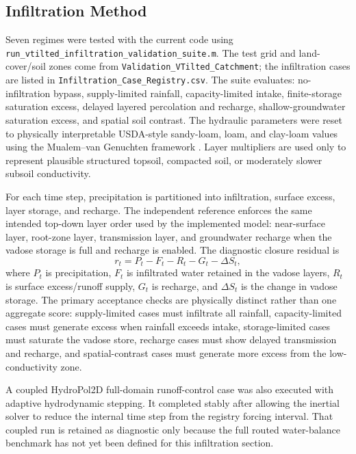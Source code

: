 \documentclass[11pt]{article}
\begin{document}
\subsection{Infiltration Method}
\label{sec:infiltration-method}
Seven regimes were tested with the current code using \texttt{run\_vtilted\_infiltration\_validation\_suite.m}. The test grid and land-cover/soil zones come from \texttt{Validation\_VTilted\_Catchment}; the infiltration cases are listed in \texttt{Infiltration\_Case\_Registry.csv}. The suite evaluates: no-infiltration bypass, supply-limited rainfall, capacity-limited intake, finite-storage saturation excess, delayed layered percolation and recharge, shallow-groundwater saturation excess, and spatial soil contrast. The hydraulic parameters were reset to physically interpretable USDA-style sandy-loam, loam, and clay-loam values using the Mualem--van Genuchten framework \cite{Mualem1976,VanGenuchten1980,CarselParrish1988}. Layer multipliers are used only to represent plausible structured topsoil, compacted soil, or moderately slower subsoil conductivity.

For each time step, precipitation is partitioned into infiltration, surface excess, layer storage, and recharge. The independent reference enforces the same intended top-down layer order used by the implemented model: near-surface layer, root-zone layer, transmission layer, and groundwater recharge when the vadose storage is full and recharge is enabled. The diagnostic closure residual is
\begin{equation}
r_t = P_t - F_t - R_t - G_t - \Delta S_t,
\end{equation}
where $P_t$ is precipitation, $F_t$ is infiltrated water retained in the vadose layers, $R_t$ is surface excess/runoff supply, $G_t$ is recharge, and $\Delta S_t$ is the change in vadose storage. The primary acceptance checks are physically distinct rather than one aggregate score: supply-limited cases must infiltrate all rainfall, capacity-limited cases must generate excess when rainfall exceeds intake, storage-limited cases must saturate the vadose store, recharge cases must show delayed transmission and recharge, and spatial-contrast cases must generate more excess from the low-conductivity zone.

A coupled HydroPol2D full-domain runoff-control case was also executed with adaptive hydrodynamic stepping. It completed stably after allowing the inertial solver to reduce the internal time step from the registry forcing interval. That coupled run is retained as diagnostic only because the full routed water-balance benchmark has not yet been defined for this infiltration section.
\end{document}
